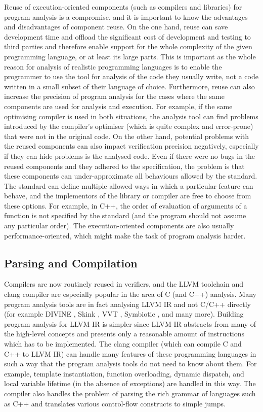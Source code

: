 Reuse of execution-oriented components (such as compilers and libraries) for
program analysis is a compromise, and it is important to know the advantages and
disadvantages of component reuse.
On the one hand, reuse can save development time and offload the significant cost
of development and testing to third parties and therefore enable support for the whole complexity of the given programming language, or at least its large parts.
This is important as the whole reason for analysis of realistic programming languages is to enable the programmer to use the tool for analysis of the code they usually write, not a code written in a small subset of their language of choice.
Furthermore, reuse can also increase the precision of program analysis for the cases where the same components are used for analysis and execution.
For example, if the same optimising compiler is used in both situations, the analysis tool can find problems introduced by the compiler's optimiser (which is quite complex and error-prone) that were not in the original code.
On the other hand, potential problems with the reused components can also
impact verification precision negatively, especially if they can hide
problems is the analysed code.
Even if there were no bugs in the reused components and they adhered to the specification, the problem is that these components can under-approximate all behaviours allowed by the standard.
The standard can define multiple allowed ways in which a particular feature can behave, and the implementors of the library or compiler are free to choose from these options.
For example, in C++, the order of evaluation of arguments of a function is not specified by the standard (and the program should not assume any particular order).
The execution-oriented components are also usually performance-oriented, which might make the task of program analysis harder.

\subsection{Parsing and Compilation}

Compilers are now routinely reused in verifiers, and the LLVM toolchain and clang compiler are especially popular in the area of C (and C++) analysis.
Many program analysis tools are in fact analysing LLVM IR and not C/C++ directly (for example DIVINE , Skink , VVT , Symbiotic , and many more).
Building program analysis for LLVM IR is simpler since LLVM IR abstracts from
many of the high-level concepts and presents only a reasonable amount of
instructions which has to be implemented.
The clang compiler (which can compile C and C++ to LLVM IR) can handle many
features of these programming languages in such a way that the program analysis
tools do not need to know about them.
For example, template instantiation, function overloading, dynamic dispatch, and
local variable lifetime (in the absence of exceptions) are handled in this way.
The compiler also handles the problem of parsing the rich grammar of languages such as C++ and translates various control-flow constructs to simple jumps.

